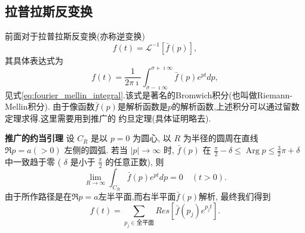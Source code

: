 \subsection{拉普拉斯反变换}
\label{subsec:inverse_laplace_transform}
前面对于拉普拉斯反变换(亦称逆变换)
\begin{equation}
    f(t) = \mathcal{L}^{-1} [ \bar{f}(p)],
\end{equation}
其具体表达式为
\begin{equation}
    f(t)=\frac{1}{2 \pi \imath} \int_{\sigma-\imath \infty}^{\sigma+\imath \infty} \bar{f}(p) e^{ p t} dp, 
\end{equation}
见式\ref{eq:fourier_mellin_integral}.该式是著名的Bromwich积分(也叫做Riemann-Mellin积分).
由于像函数$\bar{f}(p)$是解析函数是$p$的解析函数,上述积分可以通过留数定理求得.这里需要用到推广的
约旦定理(具体证明略去).

\textbf{推广的约当引理} 设 $C_R$ 是以 $p=0$ 为圆心, 以 $R$ 为半径的圆周在直线 $\Re p=a(>0)$ 左侧的圆弧. 若当 $|p| \rightarrow \infty$ 时, $\bar{f}(p)$ 在 $\frac{\pi}{2}-\delta \leqslant \operatorname{Arg} p \leqslant \frac{3}{2} \pi+\delta$ 中一致趋于零 ( $\delta$ 是小于 $\frac{\pi}{2}$ 的任意正数), 则
$$
\lim _{R \rightarrow \infty} \int_{C_R} \bar{f}(p) e^{p t} d p=0 \quad(t>0) .
$$
由于所作路径是在$\Re p = a$左半平面,而右半平面$\bar{f}(p)$解析, 最终我们得到
\begin{equation}
    f(t) = \sum_{p_j \in \text{全平面}} Res [ \bar{f}(p_j) e^{p_j t}].
\end{equation}

